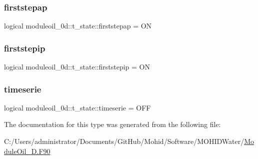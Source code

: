\subsubsection{\texorpdfstring{firststepap}{firststepap}}
{\footnotesize\ttfamily logical moduleoil\+\_\+0d\+::t\+\_\+state\+::firststepap = ON\hspace{0.3cm}{\ttfamily [private]}}

\mbox{\label{structmoduleoil__0d_1_1t__state_a876b74c843764c20141a40a4a348dc25}} 
\subsubsection{\texorpdfstring{firststepip}{firststepip}}
{\footnotesize\ttfamily logical moduleoil\+\_\+0d\+::t\+\_\+state\+::firststepip = ON\hspace{0.3cm}{\ttfamily [private]}}

\mbox{\label{structmoduleoil__0d_1_1t__state_ae49b133eb6b58026ebe12dc4afe3fd32}} 
\subsubsection{\texorpdfstring{timeserie}{timeserie}}
{\footnotesize\ttfamily logical moduleoil\+\_\+0d\+::t\+\_\+state\+::timeserie = O\+FF\hspace{0.3cm}{\ttfamily [private]}}



The documentation for this type was generated from the following file\+:\begin{DoxyCompactItemize}
\item 
C\+:/\+Users/administrator/\+Documents/\+Git\+Hub/\+Mohid/\+Software/\+M\+O\+H\+I\+D\+Water/\mbox{\hyperlink{_module_oil__0_d_8_f90}{Module\+Oil\+\_\+D.\+F90}}\end{DoxyCompactItemize}
